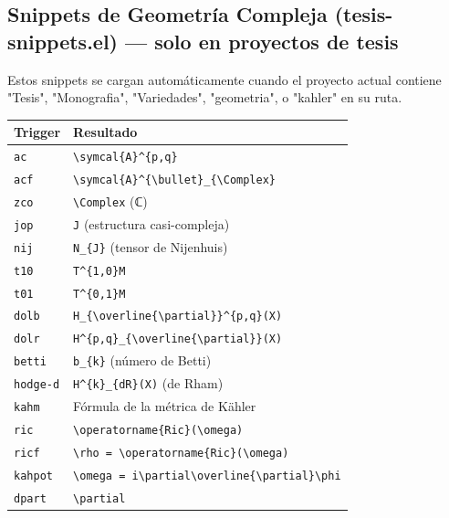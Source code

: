 \documentclass[11pt]{article}
\begin{document}
\subsection{Snippets de Geometría Compleja (tesis-snippets.el) — solo en proyectos de tesis}
\label{sec:orgcbf0056}

Estos snippets se cargan automáticamente cuando el proyecto actual contiene "Tesis", "Monografia", "Variedades", "geometria", o "kahler" en su ruta.

\begin{center}
\begin{tabular}{ll}
Trigger & Resultado\\
\hline
\texttt{ac} & \texttt{\textbackslash{}symcal\{A\}\textasciicircum{}\{p,q\}}\\
\texttt{acf} & \texttt{\textbackslash{}symcal\{A\}\textasciicircum{}\{\textbackslash{}bullet\}\_\{\textbackslash{}Complex\}}\\
\texttt{zco} & \texttt{\textbackslash{}Complex} (ℂ)\\
\texttt{jop} & \texttt{J} (estructura casi-compleja)\\
\texttt{nij} & \texttt{N\_\{J\}} (tensor de Nijenhuis)\\
\texttt{t10} & \texttt{T\textasciicircum{}\{1,0\}M}\\
\texttt{t01} & \texttt{T\textasciicircum{}\{0,1\}M}\\
\texttt{dolb} & \texttt{H\_\{\textbackslash{}overline\{\textbackslash{}partial\}\}\textasciicircum{}\{p,q\}(X)}\\
\texttt{dolr} & \texttt{H\textasciicircum{}\{p,q\}\_\{\textbackslash{}overline\{\textbackslash{}partial\}\}(X)}\\
\texttt{betti} & \texttt{b\_\{k\}} (número de Betti)\\
\texttt{hodge-d} & \texttt{H\textasciicircum{}\{k\}\_\{dR\}(X)} (de Rham)\\
\texttt{kahm} & Fórmula de la métrica de Kähler\\
\texttt{ric} & \texttt{\textbackslash{}operatorname\{Ric\}(\textbackslash{}omega)}\\
\texttt{ricf} & \texttt{\textbackslash{}rho = \textbackslash{}operatorname\{Ric\}(\textbackslash{}omega)}\\
\texttt{kahpot} & \texttt{\textbackslash{}omega = i\textbackslash{}partial\textbackslash{}overline\{\textbackslash{}partial\}\textbackslash{}phi}\\
\texttt{dpart} & \texttt{\textbackslash{}partial}\\

\end{tabular}
\end{center}
\end{document}
